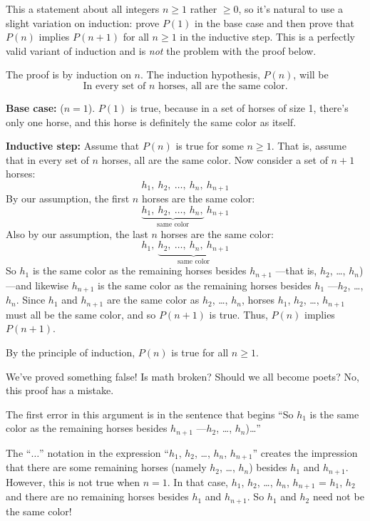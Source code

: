 This a statement about all integers $n \geq 1$ rather $\geq 0$, so it's
natural to use a slight variation on induction: prove $P(1)$ in the base
case and then prove that $P(n)$ implies $P(n+1)$ for all $n \geq 1$ in the
inductive step.  This is a perfectly valid variant of induction and is
\emph{not} the problem with the proof below.

\begin{falseproof}

The proof is by induction on $n$.  The induction hypothesis, $P(n)$, will be
\begin{equation}\label{horsehyp}
\text{In every set of $n$ horses, all are the same color.}
\end{equation}

\textbf{Base case:} ($n=1$).  $P(1)$ is true, because in a set of horses
of size 1, there's only one horse, and this horse is definitely the same
color as itself.

\textbf{Inductive step:} Assume that $P(n)$ is true for some $n \geq 1$.
That is, assume that in every set of $n$ horses, all are the same color.
Now consider a set of $n+1$ horses:
%
\[
h_1,\ h_2,\ \dots,\ h_n,\ h_{n+1}
\]
%
By our assumption, the first $n$ horses are the same color:
%
\[
\underbrace{h_1,\ h_2,\ \dots,\ h_n,}_{\text{same color}}\ h_{n+1}
\]
%
Also by our assumption, the last $n$ horses are the same color:
%
\[
h_1,\ \underbrace{h_2,\ \dots,\ h_n,\ h_{n+1}}_{\text{same color}}
\]
%
So $h_1$ is the same color as the remaining horses besides $h_{n+1}$
---that is, $h_2$, \ldots, $h_n$) ---and likewise $h_{n+1}$ is the same color
as the remaining horses besides $h_1$ ---$h_2$, \ldots, $h_n$.
Since $h_1$ and $h_{n+1}$ are the same color as $h_2$, \ldots, $h_n$,
horses $h_1$, $h_2$, \dots, $h_{n+1}$ must all be the same color, and so
$P(n+1)$ is true.  Thus, $P(n)$ implies $P(n+1)$.

By the principle of induction, $P(n)$ is true for all $n \geq 1$.
\end{falseproof}
We've proved something false!  Is math broken?  Should we all become
poets?  No, this proof has a mistake.

The first error in this argument is in the sentence that begins ``So
$h_1$ is the same color as the remaining horses besides $h_{n+1}$
---$h_2$, \dots, $h_n$)\dots''

The ``$\dots$'' notation in the expression ``$h_1$, $h_2$, \dots,
$h_n$, $h_{n+1}$'' creates the impression that there are some
remaining horses (namely $h_2$, \dots, $h_n$) besides $h_1$ and
$h_{n+1}$.  However, this is not true when $n = 1$.  In that case,
$h_1$, $h_2$, \dots, $h_n$, $h_{n+1}$ = $h_1$, $h_2$ and there are no
remaining horses besides $h_1$ and $h_{n+1}$.  So $h_1$ and $h_2$ need
not be the same color!


